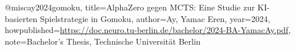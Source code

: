 @misc{ay2024gomoku,
  title={AlphaZero gegen MCTS: Eine Studie zur KI-basierten Spielstrategie in Gomoku},
  author={Ay, Yamac Eren},
  year={2024},
  howpublished={\url{https://doc.neuro.tu-berlin.de/bachelor/2024-BA-YamacAy.pdf}},
  note={Bachelor's Thesis, Technische Universität Berlin}
}
